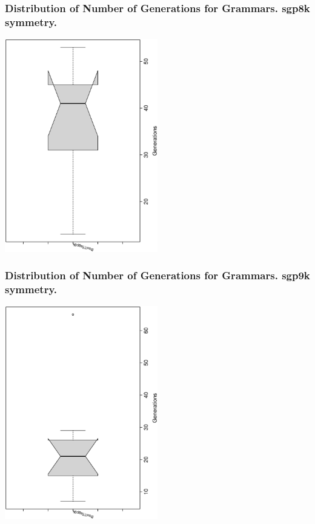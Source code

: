 \documentclass[18pt,c]{beamer}
\begin{document}
 \begin{frame}
 \frametitle{ Distribution of Number of Generations for Grammars. sgp8k  symmetry. }
 \begin{center}
\includegraphics[width=0.5\textwidth, angle=-90]
{ExpFboxplottGenerations006.eps}
 \end{center}
 \label{ExpFboxplottGenerations006.eps}  
 \end{frame}

 \begin{frame}
 \frametitle{ Distribution of Number of Generations for Grammars. sgp9k  symmetry. }
 \begin{center}
\includegraphics[width=0.5\textwidth, angle=-90]
{ExpFboxplottGenerations007.eps}
 \end{center}
 \label{ExpFboxplottGenerations007.eps}  
 \end{frame}
\end{document}
